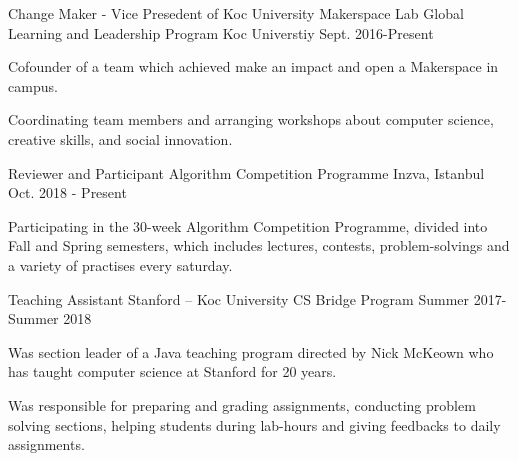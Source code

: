 

\begin{cventries}
  \cventry
    {Change Maker - Vice Presedent of Koc University Makerspace Lab} %
    {Global Learning and Leadership Program} %
    {Koc Universtiy} %
    {Sept. 2016-Present} %
    {
      \begin{cvitems} %
        \item {Cofounder of a team which achieved make an impact and open a Makerspace in campus.}
        \item {Coordinating team members and arranging workshops about computer science, creative skills, and social innovation. }
      \end{cvitems}
    }
  \cventry
    {Reviewer and Participant} %
    {Algorithm Competition Programme} %
    {Inzva, Istanbul} %
    {Oct. 2018 - Present} %
    {
      \begin{cvitems} %
        \item {Participating in the 30-week Algorithm Competition Programme, divided into Fall and Spring semesters, which includes lectures, contests, problem-solvings and a variety of practises every saturday.}
      \end{cvitems}
    }


  \cventry
    {Teaching Assistant } %
    {Stanford – Koc University CS Bridge Program} %
    {} %
    {Summer 2017-Summer 2018} %
    {
      \begin{cvitems} %
        \item {Was section leader of a Java teaching program directed by Nick McKeown who has taught computer science at Stanford for 20 years.}
        \item {Was responsible for preparing and grading assignments, conducting problem solving sections, helping students during lab-hours and giving feedbacks to daily assignments.}
      \end{cvitems}
    }
    

\end{cventries}
